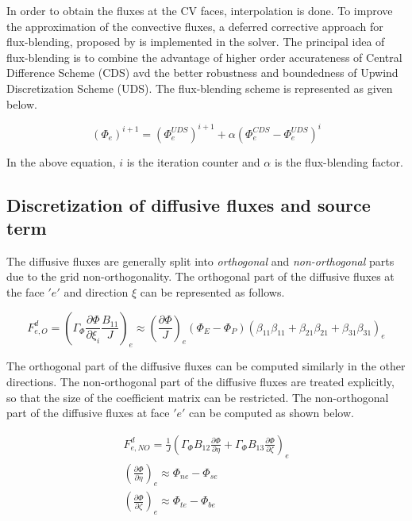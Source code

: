 In order to obtain the fluxes at the CV faces, interpolation is done. To improve the approximation of the convective fluxes, a deferred corrective approach for flux-blending, proposed by \citet{khosla1974diagonally} is implemented in the solver. The principal idea of flux-blending is to combine the advantage of higher order accurateness of Central Difference Scheme (CDS) avd the better robustness and boundedness of Upwind Discretization Scheme (UDS). The flux-blending scheme is represented as given below.

\begin{equation}
\left(\Phi_{e}\right)^{i+1} = \left(\Phi_{e}^{UDS}\right)^{i+1} + \alpha \left(\Phi_{e}^{CDS} - \Phi_{e}^{UDS} \right)^i
\label{eqn:3.55}
\end{equation}

In the above equation, $i$ is the iteration counter and $\alpha$ is the flux-blending factor. 

\subsection{Discretization of diffusive fluxes and source term}

The diffusive fluxes are generally split into \textit{orthogonal} and \textit{non-orthogonal} parts due to the grid non-orthogonality. The orthogonal part of the diffusive fluxes at the face $'e'$ and direction $\xi$ can be represented as follows.

\begin{equation}
F_{e,O}^d = \left(\Gamma_{\Phi} \frac{\partial \Phi}{\partial {\xi_i}} \frac{B_{11}}{J} \right)_e \approx \left(\frac{\partial \Phi}{J} \right)_e \left(\Phi_E - \Phi_P \right) \left(\beta_{11} \beta_{11} + \beta_{21} \beta_{21}+ \beta_{31} \beta_{31} \right)_e
\label{eqn:3.56}
\end{equation}

The orthogonal part of the diffusive fluxes can be computed similarly in the other directions. The non-orthogonal part of the diffusive fluxes are treated explicitly, so that the size of the coefficient matrix can be restricted. The non-orthogonal part of the diffusive fluxes at face $'e'$ can be computed as shown below.

\begin{align}
 F_{e,NO}^d = \frac{1}{J} \left(\Gamma_{\Phi} B_{12} \frac{\partial \Phi}{\partial {\eta}} + \Gamma_{\Phi} B_{13} \frac{\partial \Phi}{\partial {\zeta}} \right)_e\\
 \left(\frac{\partial \Phi}{\partial {\eta}} \right)_e \approx \Phi_{ne} - \Phi_{se}\\
 \left(\frac{\partial \Phi}{\partial {\zeta}} \right)_e \approx \Phi_{te} - \Phi_{be}
\label{eqn:3.59}
\end{align}

